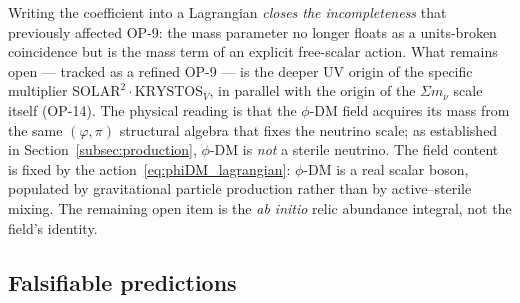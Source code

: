 \documentclass[12pt,a4paper]{article}
\newcommand{\phiDM}{\phi\text{-DM}}
\begin{document}
Writing the coefficient into a Lagrangian \emph{closes the incompleteness} that
previously affected OP-9: the mass parameter no longer floats as a units-broken
coincidence but is the mass term of an explicit free-scalar action. What remains
open --- tracked as a refined OP-9 --- is the deeper UV origin of the specific
multiplier $\mathrm{SOLAR}^2\cdot\mathrm{KRYSTOS}_V$, in parallel with the origin of
the $\Sigma m_\nu$ scale itself (OP-14). The physical reading is that the
$\phi$-DM field acquires its mass from the same $(\varphi,\pi)$ structural algebra
that fixes the neutrino scale; as established in Section~\ref{subsec:production},
$\phi$-DM is \emph{not} a sterile neutrino.
The field content is fixed by the action~\eqref{eq:phiDM_lagrangian}: $\phiDM$
is a real scalar boson, populated by gravitational particle production rather
than by active--sterile mixing.  The remaining open item is the \emph{ab initio}
relic abundance integral, not the field's identity.

\subsection{Falsifiable predictions}
\label{subsec:falsifiable}
\end{document}
